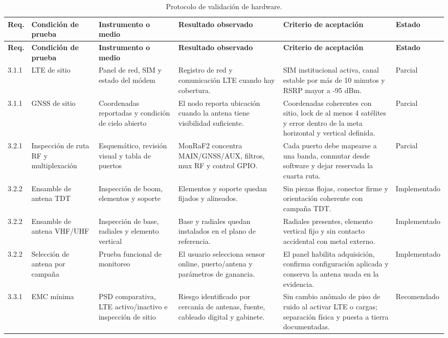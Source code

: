 \scriptsize
\setlength{\tabcolsep}{3pt}
\begin{longtable}{@{}p{1.15cm} p{2.35cm} p{2.45cm} p{2.45cm} p{2.9cm} p{1.8cm}@{}}
\caption{Protocolo de validación de hardware.}
\label{tab:hw_protocolo_validacion}\\
\toprule
\textbf{Req.} & \textbf{Condición de prueba} & \textbf{Instrumento o medio} & \textbf{Resultado observado} & \textbf{Criterio de aceptación} & \textbf{Estado} \\
\midrule
\endfirsthead
\toprule
\textbf{Req.} & \textbf{Condición de prueba} & \textbf{Instrumento o medio} & \textbf{Resultado observado} & \textbf{Criterio de aceptación} & \textbf{Estado} \\
\midrule
\endhead
3.1.1 & LTE de sitio & Panel de red, SIM y estado del módem & Registro de red y comunicación LTE cuando hay cobertura. & SIM institucional activa, canal estable por más de 10 minutos y RSRP mayor a -95 dBm. & Parcial \\
3.1.1 & GNSS de sitio & Coordenadas reportadas y condición de cielo abierto & El nodo reporta ubicación cuando la antena tiene visibilidad suficiente. & Coordenadas coherentes con sitio, lock de al menos 4 satélites y error dentro de la meta horizontal y vertical definida. & Parcial \\
3.2.1 & Inspección de ruta RF y multiplexación & Esquemático, revisión visual y tabla de puertos & MonRaF2 concentra MAIN/GNSS/AUX, filtros, mux RF y control GPIO. & Cada puerto debe mapearse a una banda, conmutar desde software y dejar reservada la cuarta ruta. & Parcial \\
3.2.2 & Ensamble de antena TDT & Inspección de boom, elementos y soporte & Elementos y soporte quedan fijados y alineados. & Sin piezas flojas, conector firme y orientación coherente con campaña TDT. & Implementado \\
3.2.2 & Ensamble de antena VHF/UHF & Inspección de base, radiales y elemento vertical & Base y radiales quedan instalados en el plano de referencia. & Radiales presentes, elemento vertical fijo y sin contacto accidental con metal externo. & Implementado \\
3.2.2 & Selección de antena por campaña & Prueba funcional de monitoreo & El usuario selecciona sensor online, puerto/antena y parámetros de ganancia. & El panel habilita adquisición, confirma configuración aplicada y conserva la antena usada en la evidencia. & Implementado \\
3.3.1 & EMC mínima & PSD comparativa, LTE activo/inactivo e inspección de sitio & Riesgo identificado por cercanía de antenas, fuente, cableado digital y gabinete. & Sin cambio anómalo de piso de ruido al activar LTE o cargas; separación física y puesta a tierra documentadas. & Recomendado \\

\end{longtable}
